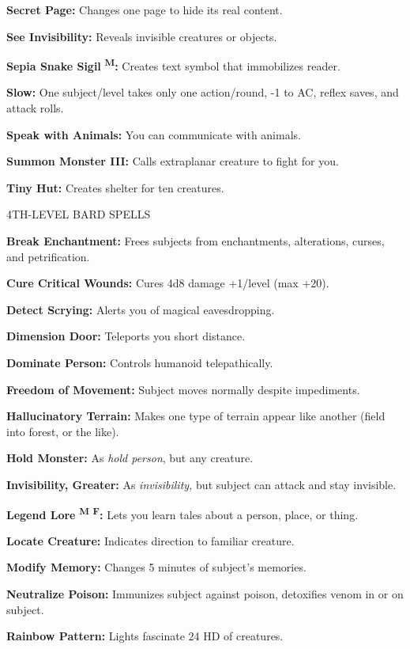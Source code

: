 \documentclass{article}
\begin{document}
\textbf{Secret Page:} Changes one page to hide its real content.

\textbf{See Invisibility:} Reveals invisible creatures or objects.

\textbf{Sepia Snake Sigil }\textsuperscript{\textbf{M}}\textbf{:} Creates text 
symbol that immobilizes reader.

\textbf{Slow:} One subject/level takes only one action/round, -1 to AC, reflex 
saves, and attack rolls.

\textbf{Speak with Animals:} You can communicate with animals.

\textbf{Summon Monster III:} Calls extraplanar creature to fight for you.

\textbf{Tiny Hut:} Creates shelter for ten creatures.

4TH-LEVEL BARD SPELLS

\textbf{Break Enchantment:} Frees subjects from enchantments, alterations, curses, 
and petrification.

\textbf{Cure Critical Wounds:} Cures 4d8 damage +1/level (max +20).

\textbf{Detect Scrying:} Alerts you of magical eavesdropping.

\textbf{Dimension Door:} Teleports you short distance.

\textbf{Dominate Person:} Controls humanoid telepathically.

\textbf{Freedom of Movement:} Subject moves normally despite impediments.

\textbf{Hallucinatory Terrain:} Makes one type of terrain appear like another (field 
into forest, or the like).

\textbf{Hold Monster:} As \textit{hold person}, but any creature.

\textbf{Invisibility, Greater:} As \textit{invisibility, }but subject can attack 
and stay invisible.

\textbf{Legend Lore }\textsuperscript{\textbf{M}}{\scriptsize{}\textbf{ }}\textsuperscript{\textbf{F}}\textbf{:} 
Lets you learn tales about a person, place, or thing.

\textbf{Locate Creature:} Indicates direction to familiar creature.

\textbf{Modify Memory:} Changes 5 minutes of subject's memories.

\textbf{Neutralize Poison:} Immunizes subject against poison, detoxifies venom 
in or on subject.

\textbf{Rainbow Pattern:} Lights fascinate 24 HD of creatures.
\end{document}
